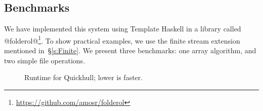 % 
% 
% 
% 


\subsection{Benchmarks}
We have implemented this system using Template Haskell in a library called @folderol@\footnote{\url{https://github.com/amosr/folderol}}.
To show practical examples, we use the finite stream extension mentioned in~\S\ref{s:Finite}.
We present three benchmarks: one array algorithm, and two simple file operations.

\begin{figure}
\caption{Runtime for Quickhull; lower is faster.}
\label{fig:bench:quickhull}
\end{figure}

